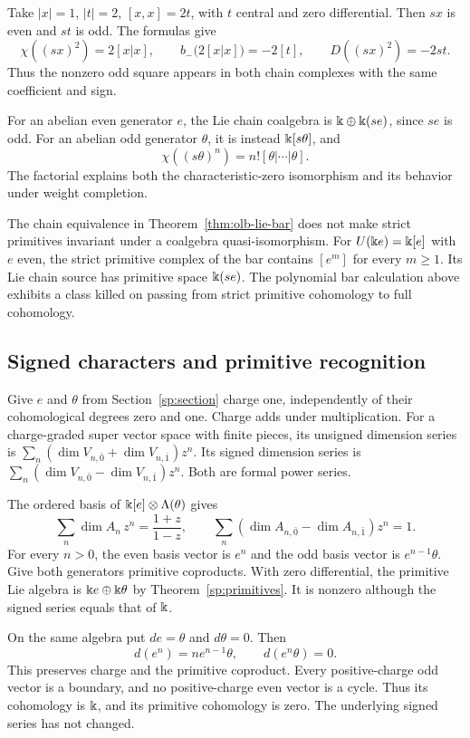\begin{example}
Take $|x|=1$, $|t|=2$, $[x,x]=2t$, with $t$ central and
zero differential.  Then $sx$ is even and $st$ is odd.
The formulas give
\[
 \chi((sx)^2)=2[x|x],\qquad
 b_-\bigl(2[x|x]\bigr)=-2[t],\qquad
 D((sx)^2)=-2st.
\]
Thus the nonzero odd square appears in both chain complexes
with the same coefficient and sign.

For an abelian even generator $e$, the Lie chain coalgebra
is $\Bbbk\oplus \Bbbk(se)$, since $se$ is odd.
For an abelian odd generator $\theta$, it is instead
$\Bbbk[s\theta]$, and
\[
 \chi((s\theta)^n)=n![\theta|\cdots|\theta].
\]
The factorial explains both the characteristic-zero
isomorphism and its behavior under weight completion.
\end{example}

The chain equivalence in Theorem~\ref{thm:olb-lie-bar} does
not make strict primitives invariant under a coalgebra
quasi-isomorphism.  For $U(\Bbbk e)=\Bbbk[e]$ with $e$ even, the strict
primitive complex of the bar contains $[e^m]$ for every
$m\geq1$. Its Lie chain source has primitive space $\Bbbk(se)$.
The polynomial bar calculation above exhibits a class killed on passing
from strict primitive cohomology to full cohomology.

\subsection{Signed characters and primitive recognition}
\label{sec:olb-characters}

Give $e$ and $\theta$ from Section~\ref{sp:section} charge one,
independently of their cohomological degrees zero and one.
Charge adds under multiplication.
For a charge-graded super vector space with finite pieces,
its unsigned dimension series is
$\sum_n(\dim V_{n,\bar0}+\dim V_{n,\bar1})z^n$.
Its signed dimension series is
$\sum_n(\dim V_{n,\bar0}-\dim V_{n,\bar1})z^n$.
Both are formal power series.

The ordered basis of $\Bbbk[e]\otimes\Lambda(\theta)$ gives
\[
 \sum_n\dim A_n\,z^n=\frac{1+z}{1-z},\qquad
 \sum_n(\dim A_{n,\bar0}-\dim A_{n,\bar1})z^n=1.
\]
For every $n>0$, the even basis vector is $e^n$ and the odd
basis vector is $e^{n-1}\theta$.
Give both generators primitive coproducts.
With zero differential, the primitive Lie algebra is
$\Bbbk e\oplus \Bbbk\theta$ by Theorem~\ref{sp:primitives}.
It is nonzero although the signed series equals that of $\Bbbk$.

On the same algebra put $de=\theta$ and $d\theta=0$.
Then
\[
 d(e^n)=ne^{n-1}\theta,\qquad d(e^n\theta)=0.
\]
This preserves charge and the primitive coproduct.
Every positive-charge odd vector is a boundary, and no
positive-charge even vector is a cycle.
Thus its cohomology is $\Bbbk$, and its primitive cohomology is
zero.  The underlying signed series has not changed.

